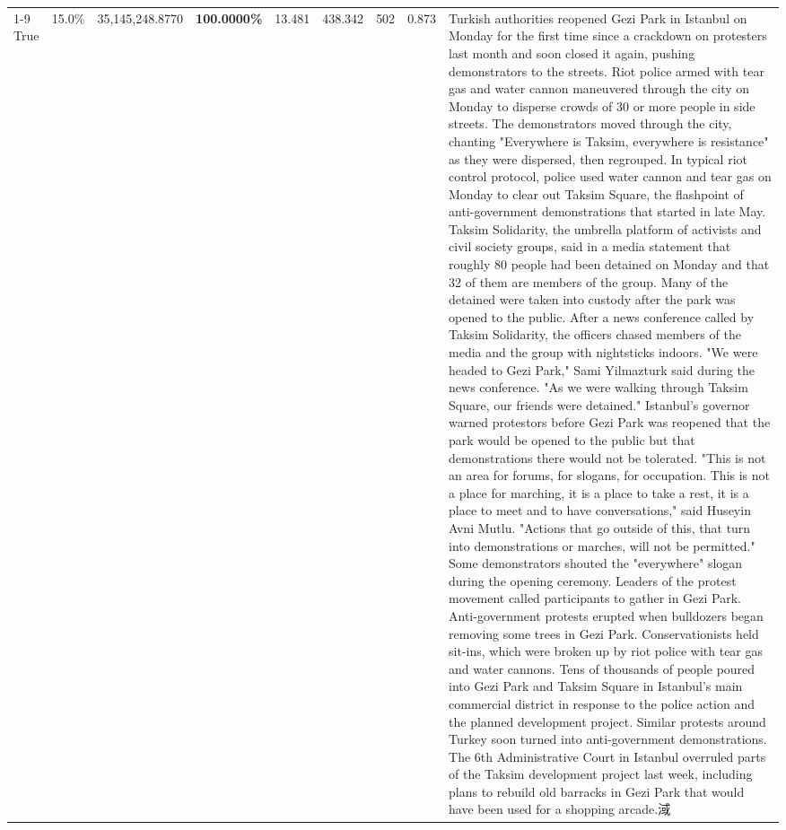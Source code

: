 \begin{table}[H]
\begin{tabular}{lllrlllll}
\cline{1-9}
True & 15.0\% & 35,145,248.8770 & \bfseries \color{red} 100.0000\% & 13.481 & 438.342 & 502 & 0.873 & Turkish authorities reopened Gezi Park in Istanbul on Monday for the first time since a crackdown on protesters last month and soon closed it again, pushing demonstrators to the streets. Riot police armed with tear gas and water cannon maneuvered through the city on Monday to disperse crowds of 30 or more people in side streets. The demonstrators moved through the city, chanting "Everywhere is Taksim, everywhere is resistance" as they were dispersed, then regrouped. In typical riot control protocol, police used water cannon and tear gas on Monday to clear out Taksim Square, the flashpoint of anti-government demonstrations that started in late May. Taksim Solidarity, the umbrella platform of activists and civil society groups, said in a media statement that roughly 80 people had been detained on Monday and that 32 of them are members of the group. Many of the detained were taken into custody after the park was opened to the public. After a news conference called by Taksim Solidarity, the officers chased members of the media and the group with nightsticks indoors. "We were headed to Gezi Park," Sami Yilmazturk said during the news conference. "As we were walking through Taksim Square, our friends were detained." Istanbul's governor warned protestors before Gezi Park was reopened that the park would be opened to the public but that demonstrations there would not be tolerated. "This is not an area for forums, for slogans, for occupation. This is not a place for marching, it is a place to take a rest, it is a place to meet and to have conversations," said Huseyin Avni Mutlu. "Actions that go outside of this, that turn into demonstrations or marches, will not be permitted." Some demonstrators shouted the "everywhere" slogan during the opening ceremony. Leaders of the protest movement called participants to gather in Gezi Park. Anti-government protests erupted when bulldozers began removing some trees in Gezi Park. Conservationists held sit-ins, which were broken up by riot police with tear gas and water cannons. Tens of thousands of people poured into Gezi Park and Taksim Square in Istanbul's main commercial district in response to the police action and the planned development project. Similar protests around Turkey soon turned into anti-government demonstrations. The 6th Administrative Court in Istanbul overruled parts of the Taksim development project last week, including plans to rebuild old barracks in Gezi Park that would have been used for a shopping arcade.淢 \\

\end{tabular}
\end{table}
